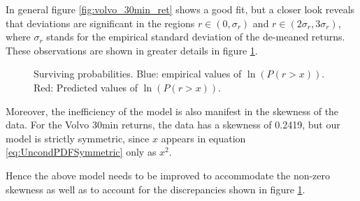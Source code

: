 \documentclass{book}
\begin{document}
In general figure \ref{fig:volvo_30min_ret} shows a good fit, but a
closer look reveals that deviations are significant in the regions $r
\in (0, \sigma_r)$ and $r \in (2\sigma_r, 3\sigma_r)$, where
$\sigma_r$ stands for the empirical standard deviation of the
de-meaned returns. These observations are
shown in greater details in figure \ref{fig:volvo_30min_ret2}.
\begin{figure}[htb!]
  \centering
  \caption{\footnotesize Surviving probabilities. Blue: empirical values of $\ln(P(r
    > x))$. Red: Predicted values of $\ln(P(r > x))$.}
  \label{fig:volvo_30min_ret2}
\end{figure}

Moreover, the inefficiency of the model is also manifest in the
skewness of the data. For the Volvo 30min returns, the data has a
skewness of 0.2419, but our model is strictly symmetric, since
$x$ appears in equation \ref{eq:UncondPDFSymmetric} only as $x^2$.

Hence the above model needs to be improved to accommodate the non-zero
skewness as well as to account for the discrepancies shown in figure
\ref{fig:volvo_30min_ret2}.
\end{document}
